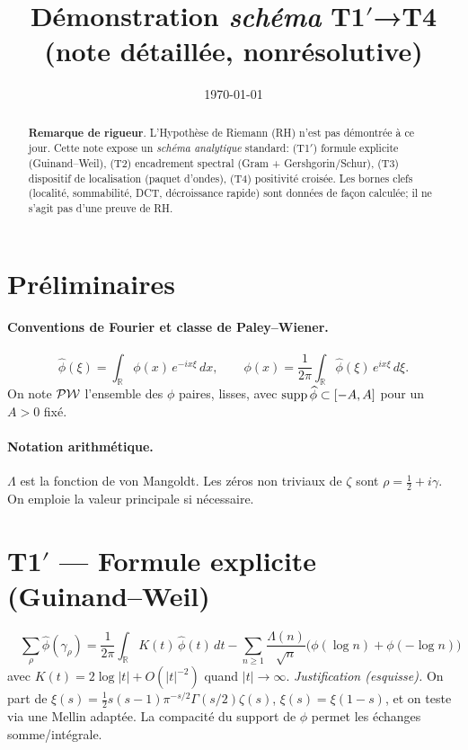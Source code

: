 \documentclass[11pt,a4paper]{proofarticle}
\title{Démonstration \emph{schéma} T1$′$→T4 (note détaillée, non\-résolutive)}
\author{\InterIAauthors}
\date{\today}
\begin{document}


\maketitle

\begin{abstract}
\textbf{Remarque de rigueur}. L’Hypothèse de Riemann (RH) n’est pas démontrée à ce jour.
Cette note expose un \emph{schéma analytique} standard: (T1$′$) formule explicite (Guinand–Weil),
(T2) encadrement spectral (Gram + Gershgorin/Schur), (T3) dispositif de localisation (paquet d’ondes),
(T4) positivité croisée. Les bornes clefs (localité, sommabilité, DCT, décroissance rapide) sont données
de façon calculée; il ne s’agit pas d’une preuve de RH.
\end{abstract}

\section*{Préliminaires}
\paragraph{Conventions de Fourier et classe de Paley–Wiener.}
\[
\widehat{\phi}(\xi)=\int_{\mathbb{R}}\phi(x)\,e^{-ix\xi}\,dx,\qquad
\phi(x)=\frac{1}{2\pi}\int_{\mathbb{R}}\widehat{\phi}(\xi)\,e^{ix\xi}\,d\xi.
\]
On note $\mathcal{PW}$ l’ensemble des $\phi$ paires, lisses, avec $\operatorname{supp}\widehat{\phi}\subset[-A,A]$ pour un $A>0$ fixé.

\paragraph{Notation arithmétique.}
$\Lambda$ est la fonction de von Mangoldt. Les zéros non triviaux de $\zeta$ sont $\rho=\tfrac12+i\gamma$.
On emploie la valeur principale si nécessaire.

\section*{\texorpdfstring{T1$′$ — Formule explicite (Guinand–Weil)}{T1′ — Formule explicite (Guinand–Weil)}}
\begin{equation*}
\boxed{\quad
\sum_{\rho}\widehat{\phi}(\gamma_\rho)
=\frac{1}{2\pi}\int_{\mathbb{R}}K(t)\,\widehat{\phi}(t)\,dt
-\sum_{n\ge1}\frac{\Lambda(n)}{\sqrt{n}}\big(\phi(\log n)+\phi(-\log n)\big)
\quad}
\end{equation*}
avec $K(t)=2\log|t|+O(|t|^{-2})$ quand $|t|\to\infty$.
\emph{Justification (esquisse).} On part de $\xi(s)=\tfrac12 s(s-1)\pi^{-s/2}\Gamma(s/2)\zeta(s)$, $\xi(s)=\xi(1-s)$,
et on teste via une Mellin adaptée. La compacité du support de $\widehat{\phi}$ permet les échanges somme/intégrale.
\end{document}
